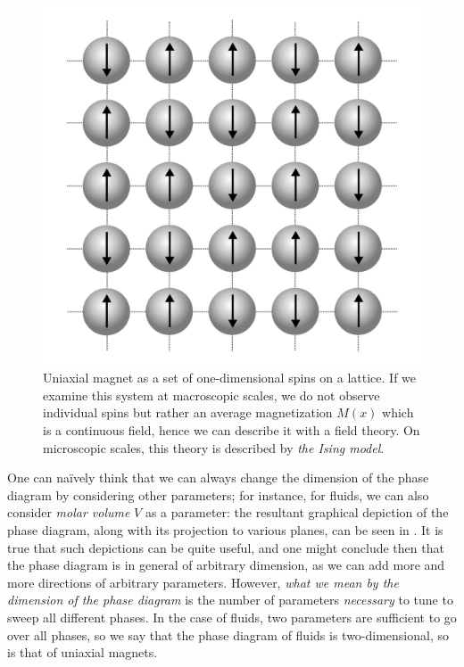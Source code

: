 \documentclass[12pt]{article}
\numberwithin{equation}{section}
\def\naively{naïvely }
\begin{document}
\begin{figure}
\centering
	\includegraphics[scale=.3]{Uniaxial_lattice}
	\caption[Uniaxial magnet as a set of one-dimensional spins on a lattice]{\label{fig:Ising model} Uniaxial magnet as a set of one-dimensional spins on a lattice. If we examine this system at macroscopic scales, we do not observe individual spins but rather an average magnetization $M(x)$ which is a continuous field, hence we can describe it with a field theory. On microscopic scales, this theory is described by \emph{the Ising model}.}
\end{figure}


One can \naively think that we can always change the dimension of the phase diagram by considering other parameters; for instance, for fluids, we can also consider \emph{molar volume} $V$ as a parameter: the resultant graphical depiction of the phase diagram, along with its projection to various planes, can be seen in \figref{\ref{fig: phase diagram 2}}. It is true that such depictions can be quite useful, and one might conclude then that the phase diagram is in general of arbitrary dimension, as we can add more and more directions of arbitrary parameters. However, \emph{what we mean by the dimension of the phase diagram} is the number of parameters \emph{necessary} to tune to sweep all different phases. In the case of fluids, two parameters are sufficient to go over all phases, so we say that the phase diagram of fluids is two-dimensional, so is that of uniaxial magnets.
\end{document}
